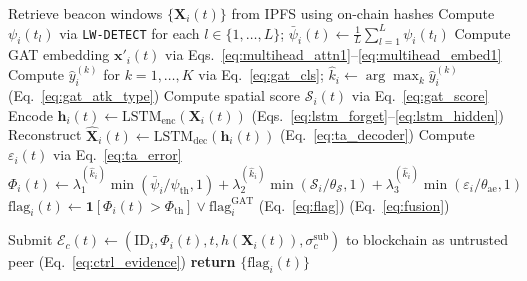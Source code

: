 \documentclass[12pt, a4paper]{report}
\begin{document}
\begin{algorithm}[H]
\caption{Full-Mode Spatio-Temporal Detection (\texttt{FULL-DETECT})}
\begin{algorithmic}[1]
  \small
  \State Retrieve beacon windows $\{\mathbf{X}_i(t)\}$ from IPFS
         using on-chain hashes
      \State Compute $\psi_i(t_l)$ via \texttt{LW-DETECT} for each
         $l \in \{1,\ldots,L\}$;
         \;$\bar{\psi}_i(t) \gets \tfrac{1}{L}
         \sum_{l=1}^{L}\psi_i(t_l)$
    \State Compute GAT embedding $\mathbf{x}'_i(t)$ via
           Eqs.~\eqref{eq:multihead_attn1}--\eqref{eq:multihead_embed1}
    \State Compute $\hat{y}_i^{(k)}$ for $k=1,\ldots,K$ via
           Eq.~\eqref{eq:gat_cls};
           $\hat{k}_i \gets \arg\max_k \hat{y}_i^{(k)}$
           \quad (Eq.~\eqref{eq:gat_atk_type})
    \State Compute spatial score $\mathcal{S}_i(t)$ via
           Eq.~\eqref{eq:gat_score}
    \State Encode $\mathbf{h}_i(t) \gets \mathrm{LSTM}_{\mathrm{enc}}(\mathbf{X}_i(t))$
           \quad (Eqs.~\eqref{eq:lstm_forget}--\eqref{eq:lstm_hidden})
    \State Reconstruct $\hat{\mathbf{X}}_i(t) \gets
           \mathrm{LSTM}_{\mathrm{dec}}(\mathbf{h}_i(t))$
           \quad (Eq.~\eqref{eq:ta_decoder})
    \State Compute $\varepsilon_i(t)$ via Eq.~\eqref{eq:ta_error}
    \State $\Phi_i(t) \gets
               \lambda_1^{(\hat{k}_i)}\min(\bar{\psi}_i/\psi_{\mathrm{th}},1)
             + \lambda_2^{(\hat{k}_i)}\min(\mathcal{S}_i/\theta_{\mathcal{S}},1)
             + \lambda_3^{(\hat{k}_i)}\min(\varepsilon_i/\theta_{\mathrm{ae}},1)$
             \State $\mathrm{flag}_i(t) \gets \mathbf{1}[\Phi_i(t) > \Phi_{\mathrm{th}}] \lor \mathrm{flag}_i^{\mathrm{GAT}}$
            \quad (Eq.~\eqref{eq:flag})
           \quad (Eq.~\eqref{eq:fusion})

    \State Submit $\mathcal{E}_c(t) \gets (\mathrm{ID}_i, \Phi_i(t), t,
       h(\mathbf{X}_i(t)), \sigma_c^{\mathrm{sub}})$
       to blockchain as untrusted peer \quad (Eq.~\eqref{eq:ctrl_evidence})
  \EndFor
  \State \textbf{return} $\{\mathrm{flag}_i(t)\}$
  \EndProcedure
\end{algorithmic}
\label{alg:full_detection}
\end{algorithm}
\end{document}
